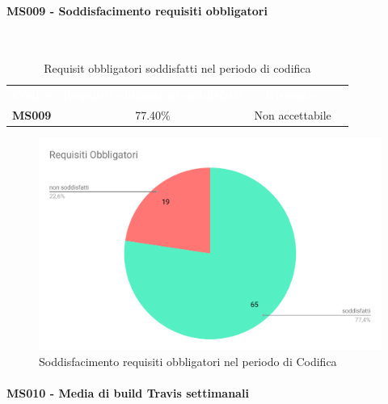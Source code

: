 \paragraph{MS009 - Soddisfacimento requisiti obbligatori}\mbox{}\\[0,3cm]
    \begin{table}[H]
        \centering
        \begin{tabular}{cccc}
        \rowcolor{greySWEight}
        \textcolor{white}{\textbf{Codice}} &
        \textcolor{white}{\textbf{Requisiti obbligatori soddisfatti}} &
        \textcolor{white}{\textbf{Riscontro}}\\
        \textbf{MS009}& 77.40\% & \textcolor{BrickRed}{Non accettabile} \\

        \end{tabular}
        \caption{Requisit obbligatori soddisfatti nel periodo di codifica}
    \end{table}
    \begin{figure}[H]
        \centering
        \includegraphics[width=0.7\linewidth]{sez/App_Esito/Qualifica/graph/RequisitiObbligatori.pdf}
        \caption{Soddisfacimento requisiti obbligatori nel periodo di Codifica}
    \end{figure}

\paragraph{MS010 - Media di build Travis settimanali}\mbox{}\\[0,3cm]
    

